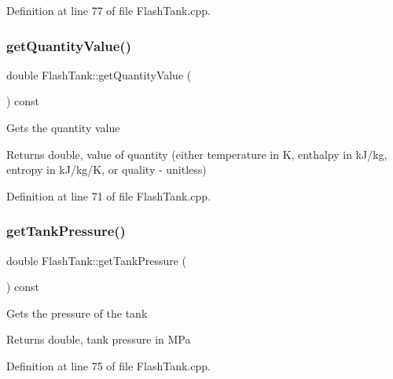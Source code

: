 Definition at line 77 of file Flash\+Tank.\+cpp.

\mbox{\label{class_flash_tank_ab2145598969881df58736a1b65326d17}} 
\subsubsection{\texorpdfstring{get\+Quantity\+Value()}{getQuantityValue()}}
{\footnotesize\ttfamily double Flash\+Tank\+::get\+Quantity\+Value (\begin{DoxyParamCaption}{ }\end{DoxyParamCaption}) const}

Gets the quantity value \begin{DoxyReturn}{Returns}
double, value of quantity (either temperature in K, enthalpy in k\+J/kg, entropy in k\+J/kg/K, or quality -\/ unitless) 
\end{DoxyReturn}


Definition at line 71 of file Flash\+Tank.\+cpp.

\mbox{\label{class_flash_tank_af5d4f0bf7babe61120e1e4452594e1af}} 
\subsubsection{\texorpdfstring{get\+Tank\+Pressure()}{getTankPressure()}}
{\footnotesize\ttfamily double Flash\+Tank\+::get\+Tank\+Pressure (\begin{DoxyParamCaption}{ }\end{DoxyParamCaption}) const}

Gets the pressure of the tank \begin{DoxyReturn}{Returns}
double, tank pressure in M\+Pa 
\end{DoxyReturn}


Definition at line 75 of file Flash\+Tank.\+cpp.

\mbox{\label{class_flash_tank_a2bcbd92d39ef3c760bdd65066ba3d34a}} 
